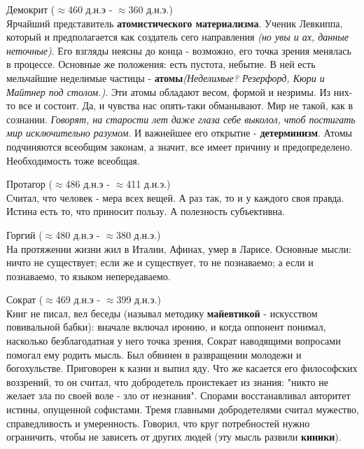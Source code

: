 \documentclass[12pt,a4paper]{article}
\begin{document}
Демокрит ($\approx$460 д.н.э - $\approx$360 д.н.э.)\\
Ярчайший представитель \textbf{атомистического материализма}. Ученик Левкиппа, который и предполагается как создатель сего направления \textit{(но увы и ах, данные неточные)}.
Его взгляды неясны до конца - возможно, его точка зрения менялась в процессе. Основные же положения: есть пустота, небытие. В ней есть мельчайшие неделимые частицы - \textbf{атомы}\textit{(Неделимые? Резерфорд, Кюри и Майтнер под столом.)}. Эти атомы обладают весом, формой и незримы. Из них-то все и состоит. Да, и чувства нас опять-таки обманывают. Мир не такой, как в сознании. \textit{Говорят, на старости лет даже глаза себе выколол, чтоб постигать мир исключительно разумом}. И важнейшее его открытие - \textbf{детерминизм}. Атомы подчиняются всеобщим законам, а значит, все имеет причину и предопределено. Необходимость тоже всеобщая. 

Протагор ($\approx$486 д.н.э - $\approx$411 д.н.э.)\\
Считал, что человек - мера всех вещей. А раз так, то и у каждого своя правда. Истина есть то, что приносит пользу. А полезность субъективна.

Горгий ($\approx$480 д.н.э - $\approx$380 д.н.э.)\\
На протяжении жизни жил в Италии, Афинах, умер в Ларисе. Основные мысли: ничто не существует; если же и существует, то не познаваемо; а если и познаваемо, то языком непередаваемо.

Сократ ($\approx$469 д.н.э - $\approx$399 д.н.э.)\\
Книг не писал, вел беседы (называл методику \textbf{майевтикой} - искусством повивальной бабки): вначале включал иронию, и когда оппонент понимал, насколько безблагодатная у него точка зрения, Сократ наводящими вопросами помогал ему родить мысль. Был обвинен в развращении молодежи и богохульстве. Приговорен к казни и выпил яду. Что же касается его философских воззрений, то он считал, что добродетель проистекает из знания: "никто не желает зла по своей воле - зло от незнания". Спорами восстанавливал авторитет истины, опущенной софистами. Тремя главными добродетелями считал мужество, справедливость и умеренность. Говорил, что круг потребностей нужно ограничить, чтобы не зависеть от других людей (эту мысль развили \textbf{киники}).
\end{document}
